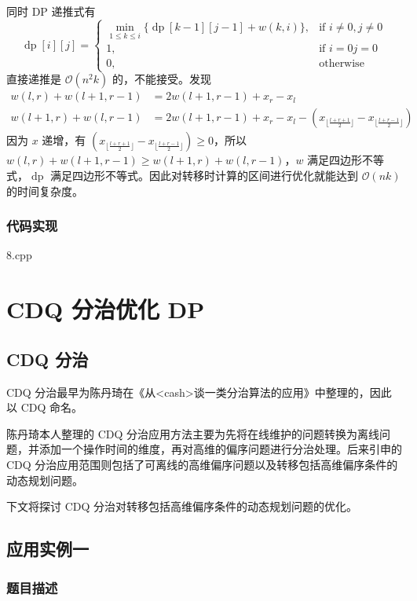 同时 DP 递推式有 \[
\operatorname{dp}[i][j]=
\left\{
\begin{array}{ll}
\min\limits_{1\le k\le i}\{\operatorname{dp}[k-1][j-1]+w(k,i)\},&\text{if } i\neq0,j\neq0\\
1,&\text{if }i=0 j=0\\
0,&\text{otherwise}
\end{array}
\right.
\] 直接递推是 \(\mathcal{O}(n^2k)\) 的，不能接受。发现 \[
\begin{aligned}
w(l,r)+w(l+1,r-1)&=2w(l+1,r-1)+x_r-x_l\\
w(l+1,r)+w(l,r-1)&=2w(l+1,r-1)+x_r-x_l-(x_{\lfloor \frac{l+r+1}{2}\rfloor}-x_{\lfloor \frac{l+r-1}{2}\rfloor})
\end{aligned}
\] 因为 \(x\) 递增，有
\((x_{\lfloor \frac{l+r+1}{2}\rfloor}-x_{\lfloor \frac{l+r-1}{2}\rfloor})\ge0\)，所以
\(w(l,r)+w(l+1,r-1)\ge w(l+1,r)+w(l,r-1)\)，\(w\)
满足四边形不等式，\(\operatorname{dp}\)
满足四边形不等式。因此对转移时计算的区间进行优化就能达到
\(\mathcal{O}(nk)\) 的时间复杂度。

\subsubsection{代码实现}

8.cpp

\section{CDQ 分治优化 DP}

\subsection{CDQ 分治}

CDQ
分治最早为陈丹琦在《从\textless cash\textgreater 谈一类分治算法的应用》中整理的，因此以
CDQ 命名。

陈丹琦本人整理的 CDQ
分治应用方法主要为先将在线维护的问题转换为离线问题，并添加一个操作时间的维度，再对高维的偏序问题进行分治处理。后来引申的
CDQ
分治应用范围则包括了可离线的高维偏序问题以及转移包括高维偏序条件的动态规划问题。

下文将探讨 CDQ 分治对转移包括高维偏序条件的动态规划问题的优化。

\subsection{应用实例一}

\subsubsection{题目描述}

